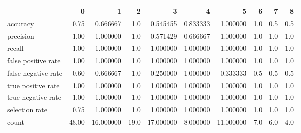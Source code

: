 \begin{tabular}{lrrrrrrrrr}
\toprule
{} &      0 &          1 &     2 &          3 &         4 &          5 &    6 &    7 &    8 \\
\midrule
accuracy            &   0.75 &   0.666667 &   1.0 &   0.545455 &  0.833333 &   1.000000 &  1.0 &  0.5 &  0.5 \\
precision           &   1.00 &   1.000000 &   1.0 &   0.571429 &  0.666667 &   1.000000 &  1.0 &  1.0 &  1.0 \\
recall              &   1.00 &   1.000000 &   1.0 &   1.000000 &  1.000000 &   1.000000 &  1.0 &  1.0 &  1.0 \\
false positive rate &   1.00 &   1.000000 &   1.0 &   1.000000 &  1.000000 &   1.000000 &  1.0 &  1.0 &  1.0 \\
false negative rate &   0.60 &   0.666667 &   1.0 &   0.250000 &  1.000000 &   0.333333 &  0.5 &  0.5 &  0.5 \\
true positive rate  &   1.00 &   1.000000 &   1.0 &   1.000000 &  1.000000 &   1.000000 &  1.0 &  1.0 &  1.0 \\
true negative rate  &   1.00 &   1.000000 &   1.0 &   1.000000 &  1.000000 &   1.000000 &  1.0 &  1.0 &  1.0 \\
selection rate      &   0.75 &   1.000000 &   1.0 &   1.000000 &  1.000000 &   1.000000 &  1.0 &  1.0 &  1.0 \\
count               &  48.00 &  16.000000 &  19.0 &  17.000000 &  8.000000 &  11.000000 &  7.0 &  6.0 &  4.0 \\
\bottomrule
\end{tabular}
